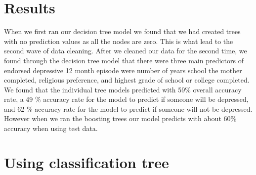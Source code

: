 \documentclass[]{article}
\newenvironment{Shaded}{\begin{snugshade}}{\end{snugshade}}
\newcommand{\KeywordTok}[1]{\textcolor[rgb]{0.13,0.29,0.53}{\textbf{#1}}}
\newcommand{\DecValTok}[1]{\textcolor[rgb]{0.00,0.00,0.81}{#1}}
\newcommand{\StringTok}[1]{\textcolor[rgb]{0.31,0.60,0.02}{#1}}
\newcommand{\CommentTok}[1]{\textcolor[rgb]{0.56,0.35,0.01}{\textit{#1}}}
\newcommand{\OtherTok}[1]{\textcolor[rgb]{0.56,0.35,0.01}{#1}}
\newcommand{\OperatorTok}[1]{\textcolor[rgb]{0.81,0.36,0.00}{\textbf{#1}}}
\newcommand{\NormalTok}[1]{#1}
\begin{document}
\section{Results}\label{results}

When we first ran our decision tree model we found that we had created
trees with no prediction values as all the nodes are zero. This is what
lead to the second wave of data cleaning. After we cleaned our data for
the second time, we found through the decision tree model that there
were three main predictors of endorsed depressive 12 month episode were
number of years school the mother completed, religious preference, and
highest grade of school or college completed. We found that the
individual tree models predicted with 59\% overall accuracy rate, a 49
\% accuracy rate for the model to predict if someone will be depressed,
and 62 \% accuracy rate for the model to predict if someone will not be
depressed. However when we ran the boosting trees our model predicts
with about 60\% accuracy when using test data.

\begin{Shaded}
\end{Shaded}

\section{Using classification tree}\label{using-classification-tree}
\end{document}
